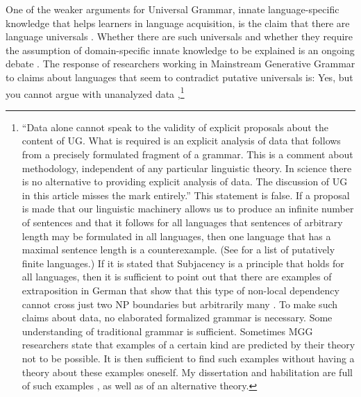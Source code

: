 \documentclass[output=paper,colorlinks,citecolor=brown]{langscibook}
\begin{document}
One of the weaker arguments for Universal Grammar, innate language-specific knowledge that helps
learners in language acquisition, is the claim that there are language
universals \parencites[--238]{Pinker94a}[]{Chomsky98a-u}. Whether there are such
universals and whether they require the assumption of domain-specific innate knowledge to be explained is an ongoing debate \parencites{Hawkins88a-ed,PF2000a,EL2009a,EL2009b}[Section~13.1]{MuellerGT-Eng5}. The response of researchers
working in Mainstream Generative Grammar to claims about languages that seem to contradict
putative universals is: Yes, but you cannot argue with unanalyzed data \citep[]{Freidin2009a},\footnote{
``Data alone cannot speak to the validity of explicit proposals
about the content of UG. What is required is an explicit analysis of data that follows from a
precisely formulated fragment of a grammar. This is a comment about methodology, independent of any
particular linguistic theory. In science there is no alternative to providing explicit analysis of
data. The discussion of UG in this article misses the mark entirely.''
This statement is false. If a proposal is made that our linguistic machinery allows us to produce an
infinite number of sentences and that it follows for all languages that sentences of arbitrary
length may be formulated in all languages, then one language that has a maximal sentence length is a
counterexample. (See  for a list of putatively finite languages.) If it is stated that Subjacency is a principle that holds for all languages, then
it is sufficient to point out that there are examples of extraposition in German that show that this
type of non-local dependency cannot cross just two NP boundaries but arbitrarily many \parencites{Mueller2004d}[Section~13.1.5]{MuellerGT-Eng5}. To make such
claims about data, no elaborated formalized grammar is necessary. Some understanding of traditional
grammar is sufficient. Sometimes MGG researchers state that examples of a
certain kind are predicted by their theory not to be possible. It is then sufficient to find such
examples without having a theory about these examples oneself. My dissertation and habilitation are
full of such examples \citep{Mueller99a,Mueller2002b}, as well as of an alternative theory.
}
\end{document}
